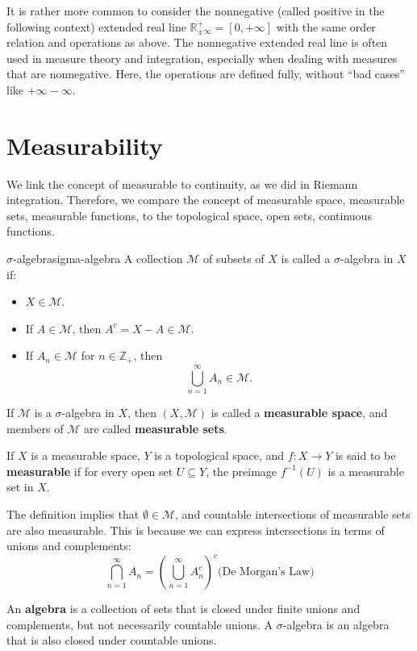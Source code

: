 \documentclass[../main.tex]{subfiles}
\begin{document}
It is rather more common to consider the nonnegative (called positive in the following context) extended real line $\mathbb{R}_{\pm \infty }^+ = [0,+\infty ]$ with the same order relation and operations as above. The nonnegative extended real line is often used in measure theory and integration, especially when dealing with measures that are nonnegative. Here, the operations are defined fully, without ``bad cases'' like $+\infty -\infty $.

\section{Measurability}

We link the concept of measurable to continuity, as we did in Riemann integration. Therefore, we compare the concept of measurable space, measurable sets, measurable functions, to the topological space, open sets, continuous functions.

\begin{definition}{$\sigma$-algebra}{sigma-algebra}
A collection $\mathcal{M}$ of subsets of $X$ is called a $\sigma$-algebra in $X$ if:
\begin{itemize}
\item $X\in \mathcal{M}$.
\item If $A\in \mathcal{M}$, then $A^c=X-A\in \mathcal{M}$.
\item If $A_n\in \mathcal{M}$ for $n\in \mathbb{Z}_+$, then
	\begin{equation*}
		\bigcup_{n=1}^{\infty} A_n \in \mathcal{M}.
	\end{equation*}
\end{itemize}

If $\mathcal{M}$ is a $\sigma$-algebra in $X$, then $(X, \mathcal{M})$ is called a \textbf{measurable space}, and members of $\mathcal{M}$ are called \textbf{measurable sets}.

If $X$ is a measurable space, $Y$ is a topological space, and $f: X \rightarrow Y$ is said to be \textbf{measurable} if for every open set $U\subseteq Y$, the preimage $f^{-1}(U)$ is a measurable set in $X$.
\end{definition}

\begin{remark}
The definition implies that $\emptyset \in \mathcal{M}$, and countable intersections of measurable sets are also measurable. This is because we can express intersections in terms of unions and complements:
\begin{equation*}
	\bigcap_{n=1}^{\infty} A_n = \left(\bigcup_{n=1}^{\infty} A_n^c\right)^c \text{(De Morgan's Law)}
\end{equation*}

An \textbf{algebra} is a collection of sets that is closed under finite unions and complements, but not necessarily countable unions. A $\sigma$-algebra is an algebra that is also closed under countable unions.
\end{remark}
\end{document}
